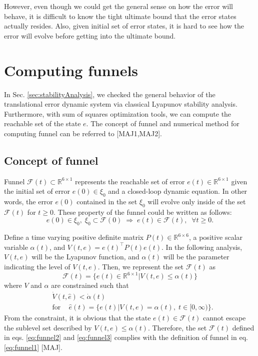 \documentclass[letterpaper, 10 pt, conference]{ieeeconf}  %
\begin{document}
However, even though we could get the general sense on how the error will behave, 
it is difficult to know the tight ultimate bound that the error states actually resides. 
Also, given initial set of error states, it is hard to see how the error will evolve before getting into the ultimate bound.

\section{Computing funnels}
In Sec. \ref{sec:stabilityAnalysis}, we checked the general behavior of the translational error dynamic system via classical Lyapunov stability analysis.
Furthermore, with sum of squares optimization tools, we can compute the reachable set of the state $e$.
The concept of funnel and numerical method for computing funnel can be referred to [MAJ1,MAJ2]. 

\subsection{Concept of funnel}
Funnel $\mathcal{F}(t) \subset \mathbb{R}^{6\times 1}$  represents the reachable set of error $e(t)\in \mathbb{R}^{6\times 1}$ given the initial set of error $e(0) \in \xi_0$ and a closed-loop dynamic equation.
In other words, the error $e(0)$ contained in the set $\xi_0$ will evolve only inside of the set $\mathcal{F}(t)$ for $t\geq 0$.
These property of the funnel could be written as follows:
\begin{equation}
e(0) \in \xi_0,\;\xi_0 \subset \mathcal{F}(0)\;\Rightarrow\; e(t) \in \mathcal{F}(t),\;\;\forall t \geq 0. \label{eq:funnel1}
\end{equation}

Define a time varying positive definite matrix $P(t) \in \mathbb{R}^{6\times 6}$, a positive scalar variable $\alpha(t)$, and $V(t,e) = e(t)^\top P(t) e(t)$.
In the following analysis, $V(t,e)$ will be the Lyapunov function, and $\alpha(t)$ will be the parameter indicating the level of $V(t,e)$.
Then, we represent the set $\mathcal{F}(t)$ as 
\begin{equation}
\mathcal{F}(t) = \{e(t) \in \mathbb{R}^{6\times 1} | V(t,e) \leq \alpha(t)\} \label{eq:funnel2}
\end{equation}
where $V$ and $\alpha$ are constrained such that
\begin{align}
&\dot{V}(t,\hat{e}) < \dot{\alpha}(t) \label{eq:funnel3} \\
&\text{for }\;\;\;\hat{e}(t) = \{e(t)|V(t,e) = \alpha(t),\;t\in[0,\infty)\}. \nonumber
\end{align}
From the constraint, it is obvious that the state $e(t) \in \mathcal{F}(t)$ cannot escape the sublevel set described by $V(t,e) \leq \alpha(t)$.
Therefore, the set $\mathcal{F}(t)$ defined in eqs. \eqref{eq:funnel2} and \eqref{eq:funnel3}
 complies with the definition of funnel in eq. \eqref{eq:funnel1} [MAJ]. 
\end{document}
